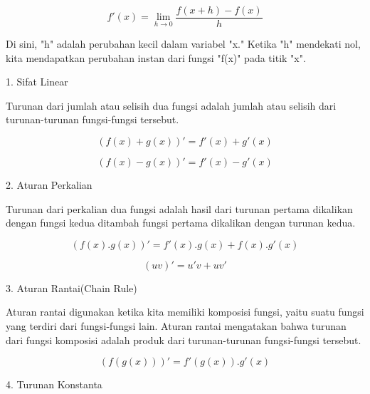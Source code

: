 \documentclass[a4paper,10pt]{article}
\begin{document}
\begin{eulernotebook}
\begin{eulercomment}
\begin{eulercomment}
\begin{eulercomment}
\begin{eulercomment}
\begin{eulercomment}
\begin{eulercomment}
\begin{eulercomment}
\begin{eulercomment}
\begin{eulercomment}
\begin{eulercomment}
\begin{eulercomment}
\begin{eulercomment}
\begin{eulercomment}
\end{eulercomment}
\begin{eulerformula}
\[
f'(x) = \lim_{h\to 0} \frac{f(x+h)-f(x)}{h}
\]
\end{eulerformula}
\begin{eulercomment}
Di sini, "h" adalah perubahan kecil dalam variabel "x." Ketika "h"
mendekati nol, kita mendapatkan perubahan instan dari fungsi "f(x)"
pada titik "x".

\begin{eulercomment}
\begin{eulercomment}
1. Sifat Linear

Turunan dari jumlah atau selisih dua fungsi adalah jumlah atau selisih
dari turunan-turunan fungsi-fungsi tersebut.

\end{eulercomment}
\begin{eulerformula}
\[
(f(x)+g(x))'=f'(x)+g'(x)
\]
\end{eulerformula}
\begin{eulerformula}
\[
(f(x)-g(x))'=f'(x)-g'(x)
\]
\end{eulerformula}
\begin{eulercomment}
2. Aturan Perkalian

Turunan dari perkalian dua fungsi adalah hasil dari turunan pertama
dikalikan dengan fungsi kedua ditambah fungsi pertama dikalikan dengan
turunan kedua.

\end{eulercomment}
\begin{eulerformula}
\[
(f(x).g(x))'=f'(x).g(x)+ f(x).g'(x)
\]
\end{eulerformula}
\begin{eulerformula}
\[
(uv)' = u'v+uv'
\]
\end{eulerformula}
\begin{eulercomment}
3. Aturan Rantai(Chain Rule)

Aturan rantai digunakan ketika kita memiliki komposisi fungsi, yaitu
suatu fungsi yang terdiri dari fungsi-fungsi lain. Aturan rantai
mengatakan bahwa turunan dari fungsi komposisi adalah produk dari
turunan-turunan fungsi-fungsi tersebut.

\end{eulercomment}
\begin{eulerformula}
\[
(f(g(x)))'=f'(g(x)).g'(x)
\]
\end{eulerformula}
\begin{eulercomment}
4. Turunan Konstanta


\end{eulercomment}
\end{eulercomment}
\end{eulercomment}
\end{eulercomment}
\end{eulercomment}
\end{eulercomment}
\end{eulercomment}
\end{eulercomment}
\end{eulercomment}
\end{eulercomment}
\end{eulercomment}
\end{eulercomment}
\end{eulercomment}
\end{eulercomment}
\end{eulercomment}
\end{eulernotebook}
\end{document}
